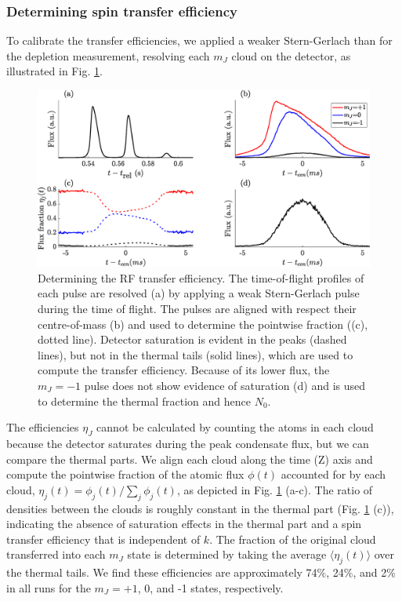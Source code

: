 \subsubsection{Determining spin transfer efficiency}
\label{sec:th_spin}

	To calibrate the transfer efficiencies, we applied a weaker Stern-Gerlach than for the depletion measurement, resolving each $m_J$ cloud on the detector, as illustrated in Fig. \ref{fig:frac_cal}. 

	\begin{figure}
	\begin{center}
		\includegraphics[width=\columnwidth]{fig/QD/frac_cal_profile}
		\caption{Determining the RF transfer efficiency. The time-of-flight profiles of each pulse are resolved (a) by applying a weak Stern-Gerlach pulse during the time of flight. The pulses are aligned with respect their centre-of-mass (b) and used to determine the pointwise fraction ((c), dotted line). Detector saturation is evident in the peaks (dashed lines), but not in the thermal tails (solid lines), which are used to compute the transfer efficiency. Because of its lower flux, the $m_J=-1$ pulse does not show evidence of saturation (d) and is used to determine the thermal fraction and hence $N_0$.}
		\label{fig:frac_cal}
	\end{center}
	\end{figure}

	The efficiencies $\eta_J$ cannot be calculated by counting the atoms in each cloud because the detector saturates during the peak condensate flux, but we can compare the thermal parts. We align each cloud along the time (Z) axis and compute the pointwise fraction of the atomic flux $\phi(t)$ accounted for by each cloud, $\eta_j(t) = \phi_j(t)/\sum_j\phi_j(t)$, as depicted in Fig. \ref{fig:frac_cal} (a-c).
	The ratio of densities between the clouds is roughly constant in the thermal part (Fig. \ref{fig:frac_cal} (c)), indicating the absence of saturation effects in the thermal part and a spin transfer efficiency that is independent of $k$. 
	The fraction of the original cloud transferred into each $m_J$ state is determined by taking the average $\langle\eta_j(t)\rangle$ over the thermal tails. 
	We find these efficiencies are approximately 74\%, 24\%, and 2\% in all runs for the $m_J=+1$, 0, and -1 states, respectively.
	
